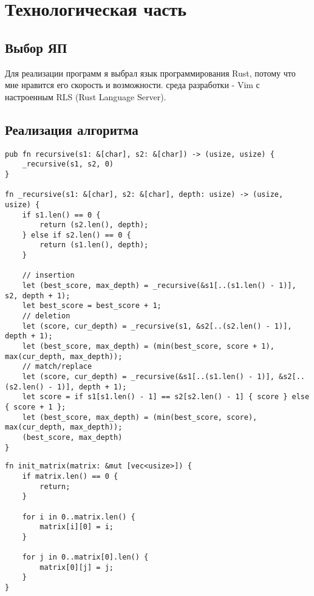 \chapter{Технологическая часть}
\section{Выбор ЯП}
Для реализации программ я выбрал язык программирования Rust, потому что мне нравится его скорость и возможности. среда разработки - Vim с настроенным RLS (Rust Language Server).

\section{Реализация алгоритма}

\begin{lstlisting}[label=some-code,caption=Функция\, реализующая рекурсивный алгоритм нахождения расстояния Левенштейна]
pub fn recursive(s1: &[char], s2: &[char]) -> (usize, usize) {
    _recursive(s1, s2, 0)
}

fn _recursive(s1: &[char], s2: &[char], depth: usize) -> (usize, usize) {
    if s1.len() == 0 {
        return (s2.len(), depth);
    } else if s2.len() == 0 {
        return (s1.len(), depth);
    }

    // insertion
    let (best_score, max_depth) = _recursive(&s1[..(s1.len() - 1)], s2, depth + 1);
    let best_score = best_score + 1;
    // deletion
    let (score, cur_depth) = _recursive(s1, &s2[..(s2.len() - 1)], depth + 1);
    let (best_score, max_depth) = (min(best_score, score + 1), max(cur_depth, max_depth));
    // match/replace
    let (score, cur_depth) = _recursive(&s1[..(s1.len() - 1)], &s2[..(s2.len() - 1)], depth + 1);
    let score = if s1[s1.len() - 1] == s2[s2.len() - 1] { score } else { score + 1 };
    let (best_score, max_depth) = (min(best_score, score), max(cur_depth, max_depth));
    (best_score, max_depth)
}
\end{lstlisting}

\begin{lstlisting}[label=some-code,caption=Функция инициализации матрицы для алгоритмов с мемоизацией]
fn init_matrix(matrix: &mut [vec<usize>]) {
    if matrix.len() == 0 {
        return;
    }

    for i in 0..matrix.len() {
        matrix[i][0] = i;
    }

    for j in 0..matrix[0].len() {
        matrix[0][j] = j;
    }
}
\end{lstlisting}

